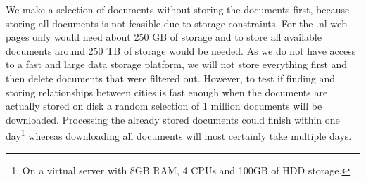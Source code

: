 We make a selection of documents without storing the documents first, because storing all documents is not feasible due to storage constraints. For the .nl web pages only would need about 250 GB of storage and to store all available documents around 250 TB of storage would be needed. As we do not have access to a fast and large data storage platform, we will not store everything first and then delete documents that were filtered out. However, to test if finding and storing relationships between cities is fast enough when the documents are actually stored on disk a random selection of 1 million documents will be downloaded. Processing the already stored documents could finish within one day\footnote{On a virtual server with 8GB RAM, 4 CPUs and 100GB of HDD storage.} whereas downloading all documents will most certainly take multiple days.
